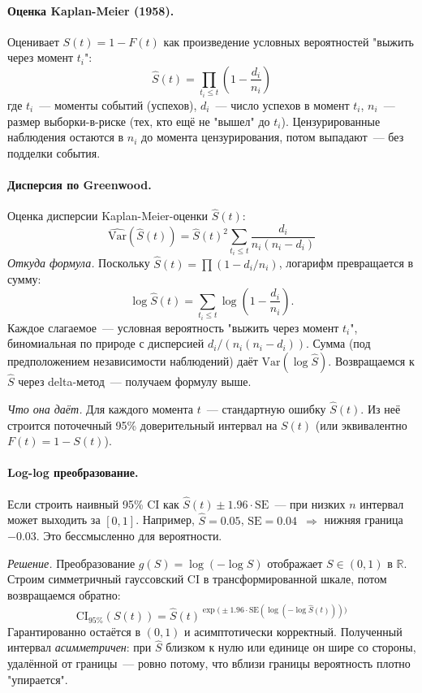 \documentclass[11pt]{article}
\begin{document}
\paragraph{Оценка Kaplan-Meier (1958).} Оценивает $S(t) = 1 - F(t)$ как произведение условных вероятностей "выжить через момент $t_i$":
\[
\hat S(t) = \prod_{t_i \le t} \left(1 - \frac{d_i}{n_i}\right)
\]
где $t_i$~--- моменты событий (успехов), $d_i$~--- число успехов в момент $t_i$, $n_i$~--- размер выборки-в-риске (тех, кто ещё не "вышел" до $t_i$). Цензурированные наблюдения остаются в $n_i$ до момента цензурирования, потом выпадают~--- без подделки события.

\paragraph{Дисперсия по Greenwood.} Оценка дисперсии Kaplan-Meier-оценки $\hat S(t)$:
\[
\widehat{\text{Var}}(\hat S(t)) = \hat S(t)^2 \sum_{t_i \le t} \frac{d_i}{n_i(n_i - d_i)}
\]
\emph{Откуда формула.} Поскольку $\hat S(t) = \prod (1 - d_i/n_i)$, логарифм превращается в сумму:
\[
\log \hat S(t) = \sum_{t_i \le t} \log\!\left(1 - \frac{d_i}{n_i}\right).
\]
Каждое слагаемое~--- условная вероятность "выжить через момент $t_i$", биномиальная по природе с дисперсией $d_i/(n_i(n_i - d_i))$. Сумма (под предположением независимости наблюдений) даёт $\text{Var}(\log \hat S)$. Возвращаемся к $\hat S$ через delta-метод~--- получаем формулу выше.

\emph{Что она даёт.} Для каждого момента $t$~--- стандартную ошибку $\hat S(t)$. Из неё строится поточечный 95\% доверительный интервал на $S(t)$ (или эквивалентно $F(t) = 1 - S(t)$).

\paragraph{Log-log преобразование.} Если строить наивный 95\% CI как $\hat S(t) \pm 1.96 \cdot \text{SE}$~--- при низких $n$ интервал может выходить за $[0,1]$. Например, $\hat S = 0.05$, $\text{SE} = 0.04$~$\Rightarrow$ нижняя граница $-0.03$. Это бессмысленно для вероятности.

\emph{Решение.} Преобразование $g(S) = \log(-\log S)$ отображает $S \in (0,1)$ в $\mathbb{R}$. Строим симметричный гауссовский CI в трансформированной шкале, потом возвращаемся обратно:
\[
\text{CI}_{95\%}(S(t)) = \hat S(t)^{\exp\big(\pm 1.96 \cdot \text{SE}(\log(-\log \hat S(t)))\big)}
\]
Гарантированно остаётся в $(0,1)$ и асимптотически корректный. Полученный интервал \emph{асимметричен}: при $\hat S$ близком к нулю или единице он шире со стороны, удалённой от границы~--- ровно потому, что вблизи границы вероятность плотно "упирается".
\end{document}
